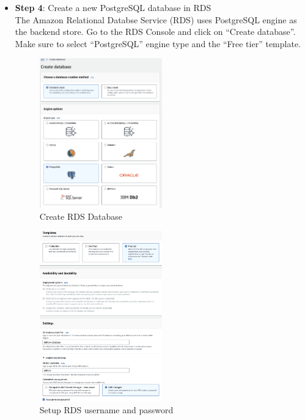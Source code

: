 \documentclass[letterpaper,12pt,notitlepage,twoside]{report}
\begin{document}
\begin{itemize}
\item \textbf{Step 4}: Create a new PostgreSQL database in RDS \\
The Amazon Relational Databse Service (RDS) uses PostgreSQL engine as the backend store. Go to the RDS Console and click on ``Create database''. Make sure to select ``PostgreSQL'' engine type and the ``Free tier'' template.

\begin{figure}[h]
	\centering
	\includegraphics[width=0.5\textwidth]{Images/create-database.png}
	\caption{Create RDS Database}
	\label{fig:11}
\end{figure}
\FloatBarrier

\begin{figure}[h]
	\centering
	\includegraphics[width=0.5\textwidth]{Images/RDS-setup.png}
	\caption{Setup RDS username and password}
	\label{fig:12}
\end{figure}
\FloatBarrier


\end{itemize}
\end{document}

